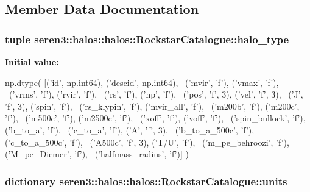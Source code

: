 \subsection{Member Data Documentation}
\hypertarget{classseren3_1_1halos_1_1halos_1_1RockstarCatalogue_a9950be1d15976a42d97debe0db24cede}{
\subsubsection[{halo\_\-type}]{\setlength{\rightskip}{0pt plus 5cm}tuple seren3::halos::halos::RockstarCatalogue::halo\_\-type}}
\label{classseren3_1_1halos_1_1halos_1_1RockstarCatalogue_a9950be1d15976a42d97debe0db24cede}
{\bfseries Initial value:}
\begin{DoxyCode}
np.dtype( [('id', np.int64), ('descid', np.int64), \
                ('mvir', 'f'), ('vmax', 'f'), \
                ('vrms', 'f'), ('rvir', 'f'), \
                ('rs', 'f'), ('np', 'f'), \
                ('pos', 'f', 3), ('vel', 'f', 3), \
                ('J', 'f', 3), ('spin', 'f'), \
                ('rs_klypin', 'f'), ('mvir_all', 'f'), \
                ('m200b', 'f'), ('m200c', 'f'), \
                ('m500c', 'f'), ('m2500c', 'f'), \
                ('xoff', 'f'), ('voff', 'f'), \
                ('spin_bullock', 'f'), ('b_to_a', 'f'), \
                ('c_to_a', 'f'), ('A', 'f', 3), \
                ('b_to_a_500c', 'f'), ('c_to_a_500c', 'f'), \
                ('A500c', 'f', 3), ('T/U', 'f'), \
                ('m_pe_behroozi', 'f'), ('M_pe_Diemer', 'f'), \
                ('halfmass_radius', 'f')] )
\end{DoxyCode}
\hypertarget{classseren3_1_1halos_1_1halos_1_1RockstarCatalogue_abbae8e93c0213ede835686f60bda9770}{
\subsubsection[{units}]{\setlength{\rightskip}{0pt plus 5cm}dictionary seren3::halos::halos::RockstarCatalogue::units}}
